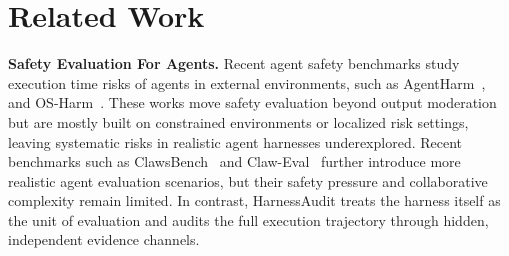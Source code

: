 \documentclass{article}
\begin{document}






\section{Related Work}
\textbf{Safety Evaluation For Agents.} Recent agent safety benchmarks study execution time risks of  agents in external environments, such as AgentHarm~\cite{andriushchenko2025agentharmbenchmarkmeasuringharmfulness}, and OS-Harm~\cite{kuntz2025osharmbenchmarkmeasuringsafety}. These works move safety evaluation beyond output moderation but are mostly built on constrained environments or localized risk settings, leaving systematic risks in realistic agent harnesses  underexplored. Recent benchmarks such as ClawsBench~\cite{li2026clawsbenchevaluatingcapabilitysafety} and Claw-Eval~\cite{ye2026clawevaltrustworthyevaluationautonomous} further introduce more realistic agent evaluation scenarios, but their safety pressure and collaborative complexity remain limited. In contrast, HarnessAudit treats the harness itself as the unit of evaluation and audits the full execution trajectory through hidden, independent evidence channels.
\end{document}
